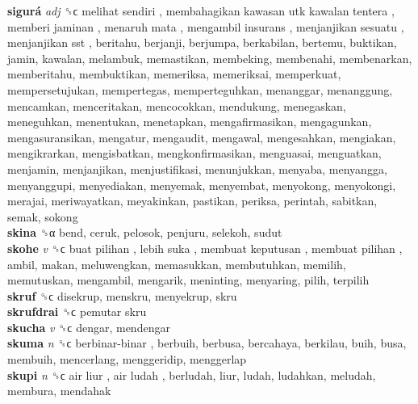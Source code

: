 \textbf{sigurá} \emph{adj}  ␝ϲ   melihat sendiri ,  membahagikan kawasan utk kawalan tentera ,  memberi jaminan ,  menaruh mata ,  mengambil insurans ,  menjanjikan sesuatu ,  menjanjikan sst , beritahu, berjanji, berjumpa, berkabilan, bertemu, buktikan, jamin, kawalan, melambuk, memastikan, membeking, membenahi, membenarkan, memberitahu, membuktikan, memeriksa, memeriksai, memperkuat, mempersetujukan, mempertegas, memperteguhkan, menanggar, menanggung, mencamkan, menceritakan, mencocokkan, mendukung, menegaskan, meneguhkan, menentukan, menetapkan, mengafirmasikan, mengagunkan, mengasuransikan, mengatur, mengaudit, mengawal, mengesahkan, mengiakan, mengikrarkan, mengisbatkan, mengkonfirmasikan, menguasai, menguatkan, menjamin, menjanjikan, menjustifikasi, menunjukkan, menyaba, menyangga, menyanggupi, menyediakan, menyemak, menyembat, menyokong, menyokongi, merajai, meriwayatkan, meyakinkan, pastikan, periksa, perintah, sabitkan, semak, sokong  \\
\textbf{skina} ␝α  bend, ceruk, pelosok, penjuru, selekoh, sudut  \\
\textbf{skohe} \emph{v}  ␝ϲ   buat pilihan ,  lebih suka ,  membuat keputusan ,  membuat pilihan , ambil, makan, meluwengkan, memasukkan, membutuhkan, memilih, memutuskan, mengambil, mengarik, meninting, menyaring, pilih, terpilih  \\
\textbf{skruf} ␝ϲ  disekrup, menskru, menyekrup, skru  \\
\textbf{skrufdrai} ␝ϲ   pemutar skru   \\
\textbf{skucha} \emph{v}  ␝ϲ  dengar, mendengar  \\
\textbf{skuma} \emph{n}  ␝ϲ   berbinar-binar , berbuih, berbusa, bercahaya, berkilau, buih, busa, membuih, mencerlang, menggeridip, menggerlap  \\
\textbf{skupi} \emph{n}  ␝ϲ   air liur ,  air ludah , berludah, liur, ludah, ludahkan, meludah, membura, mendahak  \\
